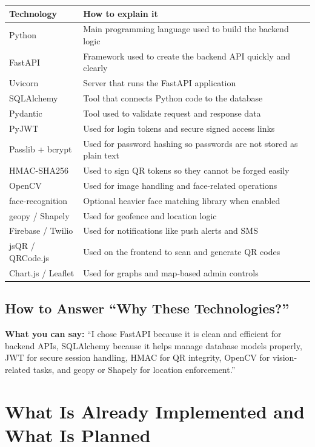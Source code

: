 \documentclass[12pt,letterpaper]{article}
\newcommand{\say}[1]{\textbf{What you can say:} ``#1''}
\begin{document}
\begin{tabularx}{\textwidth}{@{}L{3cm}Y@{}}
\toprule
\textbf{Technology} & \textbf{How to explain it} \\
\midrule
Python & Main programming language used to build the backend logic \\
FastAPI & Framework used to create the backend API quickly and clearly \\
Uvicorn & Server that runs the FastAPI application \\
SQLAlchemy & Tool that connects Python code to the database \\
Pydantic & Tool used to validate request and response data \\
PyJWT & Used for login tokens and secure signed access links \\
Passlib + bcrypt & Used for password hashing so passwords are not stored as plain text \\
HMAC-SHA256 & Used to sign QR tokens so they cannot be forged easily \\
OpenCV & Used for image handling and face-related operations \\
face-recognition & Optional heavier face matching library when enabled \\
geopy / Shapely & Used for geofence and location logic \\
Firebase / Twilio & Used for notifications like push alerts and SMS \\
jsQR / QRCode.js & Used on the frontend to scan and generate QR codes \\
Chart.js / Leaflet & Used for graphs and map-based admin controls \\
\bottomrule
\end{tabularx}

\subsection{How to Answer ``Why These Technologies?''}

\say{I chose FastAPI because it is clean and efficient for backend APIs, SQLAlchemy because it helps manage database models properly, JWT for secure session handling, HMAC for QR integrity, OpenCV for vision-related tasks, and geopy or Shapely for location enforcement.}

\section{What Is Already Implemented and What Is Planned}
\end{document}
